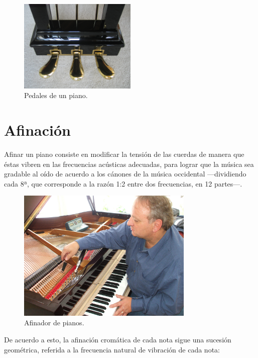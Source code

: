 \documentclass[10pt,a4paper]{article}
\begin{document}
	\begin{figure}[!ht]
		\centering
		\includegraphics[width=0.5\textwidth]{images/pedals}
		\caption[Pedales de un piano]{\label{fig:pedals} Pedales de un piano. \cite{pedals}}
	\end{figure}
	
	
	\clearpage
	\section{Afinación}
	
	Afinar un piano consiste en modificar la tensión de las cuerdas de manera 
	que éstas vibren en las frecuencias acústicas adecuadas, para lograr que la 
	música sea gradable al oído de acuerdo a los cánones de la música 
	occidental ---dividiendo cada 8ª, que corresponde a la razón 1:2 entre dos 
	frecuencias, en 12 partes---.
	
	\begin{figure}[!ht]
		\centering
		\includegraphics[width=0.75\textwidth]{images/tuner}
		\caption[Afinador de pianos]{\label{fig:tuner} Afinador de pianos. \cite{tuner}}
	\end{figure}
	
	De acuerdo a esto, la afinación cromática de cada nota sigue una sucesión 
	geométrica, referida a la frecuencia natural de vibración de cada nota:
	
\end{document}
